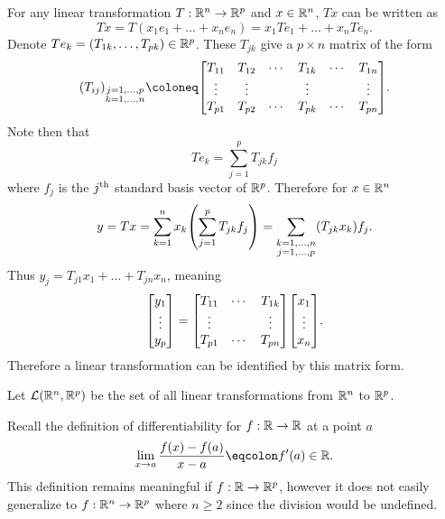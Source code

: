 \documentclass[../main.tex]{subfiles}
\begin{document}
\begin{remark}
    For any linear transformation $T : \mathbb{R}^n \to \mathbb{R}^p$ and $x \in \mathbb{R}^n$, $Tx$ can be written as
    \[
        Tx = T(x_1 e_1 + \ldots + x_n e_n) = x_1 T e_1 + \ldots + x_n T e_n
    .\]
    Denote $T e_k = \qty(T_{1k}, \ldots, T_{pk}) \in \mathbb{R}^p$. These $T_{jk}$ give a $p \times n$ matrix of the form
    \[
        (T_{ij})_{\substack{j=1,\ldots,p \\ k = 1,\ldots,n}} \coloneq \mqty[
        T_{11} & T_{12} & \cdots & T_{1k} & \cdots & T_{1n} \\
        \vdots & \vdots &        & \vdots &        & \vdots \\
        T_{p1} & T_{p2} & \cdots & T_{pk} & \cdots & T_{pn} 
        ]
    .\]
    Note then that
    \[
        T e_k = \sum_{j=1}^p T_{jk} f_j
    \]
    where $f_j$ is the $j^{\text{th}}$ standard basis vector of $\mathbb{R}^p$. Therefore for $x \in \mathbb{R}^n$
    \[
        y = Tx = \sum_{k=1}^n x_k \qty(\sum_{j=1}^p T_{jk} f_j) = \sum_{\substack{k=1,\ldots,n \\ j = 1,\ldots,p}} (T_{jk} x_k) f_j
    .\]
    Thus $y_j = T_{j1} x_1 + \ldots + T_{jn} x_n$, meaning
    \[
        \mqty[
            y_1 \\
            \vdots \\
            y_p
        ] = \mqty[
            T_{11} & \cdots & T_{1k} \\
            \vdots &        & \vdots \\
            T_{p1} & \cdots & T_{pn}
        ] \mqty[
            x_1 \\
            \vdots \\
            x_n
        ]
    .\]
    Therefore a linear transformation can be identified by this matrix form.
\end{remark}

\begin{definition}
    Let $\mathcal{L}(\mathbb{R}^n, \mathbb{R}^p)$ be the set of all linear transformations from $\mathbb{R}^n$ to $\mathbb{R}^p$.
\end{definition}

\begin{remark}
    Recall the definition of differentiability for $f : \mathbb{R} \to \mathbb{R}$ at a point $a$
    \[
        \lim_{x \to a} \frac{f(x) - f(a)}{x - a} \eqcolon f'(a) \in \R
    .\]
    This definition remains meaningful if $f : \mathbb{R} \to \mathbb{R}^p$, however it does not easily generalize to $f : \mathbb{R}^n \to \mathbb{R}^p$ where $n \geq 2$ since the division would be undefined.
\end{remark}
\end{document}
